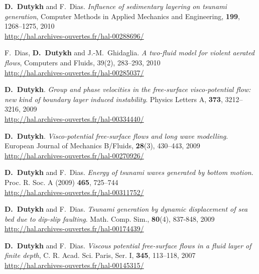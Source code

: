 \documentclass[final, a4paper, oneside, 12pt]{article}
\numberwithin{equation}{section}
\begin{document}
\begin{etaremune}
  \item \textbf{D.~Dutykh} and F.~Dias. \textit{Influence of sedimentary layering on tsunami generation}, Computer Methods in Applied Mechanics and Engineering, \textbf{199}, 1268--1275, 2010 \\ %
  \url{http://hal.archives-ouvertes.fr/hal-00288696/}
  
  \item F.~Dias, \textbf{D.~Dutykh} and J.-M.~Ghidaglia. \textit{A two-fluid model for violent aerated flows}, Computers and Fluids, 39(2), 283--293, 2010 \\ %
  \url{http://hal.archives-ouvertes.fr/hal-00285037/}
  
  
  \item \textbf{D.~Dutykh}. \textit{Group and phase velocities in the free-surface visco-potential flow: new kind of boundary layer induced instability}. Physics Letters A, \textbf{373}, 3212--3216, 2009 \\ %
  \url{http://hal.archives-ouvertes.fr/hal-00334440/}
  
  \item \textbf{D.~Dutykh}. \textit{Visco-potential free-surface flows and long wave modelling}. European Journal of Mechanics B/Fluids, \textbf{28}(3), 430--443, 2009 \\ %
  \url{http://hal.archives-ouvertes.fr/hal-00270926/}
  
  \item \textbf{D.~Dutykh} and F.~Dias. \textit{Energy of tsunami waves generated by bottom motion}. Proc. R. Soc. A (2009) \textbf{465}, 725--744 \\ %
  \url{http://hal.archives-ouvertes.fr/hal-00311752/}
  
  \item \textbf{D.~Dutykh} and F.~Dias. \textit{Tsunami generation by dynamic displacement of sea bed due to dip-slip faulting}. Math. Comp. Sim., \textbf{80}(4), 837-848, 2009 \\ %
  \url{http://hal.archives-ouvertes.fr/hal-00174439/}
  
  

  
  
  \item \textbf{D.~Dutykh} and F.~Dias. \textit{Viscous potential free-surface flows in a fluid layer of finite depth}, C. R. Acad. Sci. Paris, Ser. I, \textbf{345}, 113--118, 2007 \\ %
  \url{http://hal.archives-ouvertes.fr/hal-00145315/}
  

\end{etaremune}
\end{document}

